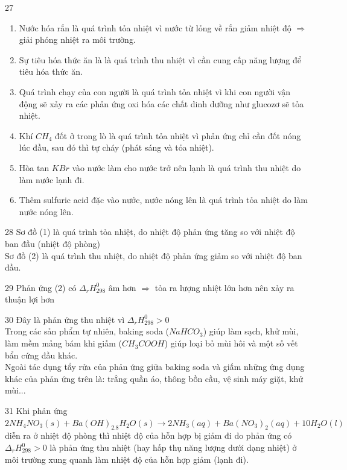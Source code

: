 \def\writeANS{}
\begin{loigiaibth}{27}
  \begin {enumerate} \item Nước hóa rắn là quá trình tỏa nhiệt vì nước từ lỏng về rắn giảm nhiệt độ $\Rightarrow $ giải phóng nhiệt ra môi trường. \item Sự tiêu hóa thức ăn là là quá trình thu nhiệt vì cần cung cấp năng lượng để tiêu hóa thức ăn. \item Quá trình chạy của con người là quá trình tỏa nhiệt vì khi con người vận động sẽ xảy ra các phản ứng oxi hóa các chất dinh dưỡng như glucozơ sẽ tỏa nhiệt. \item Khí $CH_4$ đốt ở trong lò là quá trình tỏa nhiệt vì phản ứng chỉ cần đốt nóng lúc đầu, sau đó thì tự cháy (phát sáng và tỏa nhiệt). \item Hòa tan $KBr$ vào nước làm cho nước trở nên lạnh là quá trình thu nhiệt do làm nước lạnh đi. \item Thêm sulfuric acid đặc vào nước, nước nóng lên là quá trình tỏa nhiệt do làm nước nóng lên. \end {enumerate}
\end{loigiaibth}
\def\writeANS{}
\begin{loigiaibth}{28}
  Sơ đồ (1) là quá trình tỏa nhiệt, do nhiệt độ phản ứng tăng so với nhiệt độ ban đầu (nhiệt độ phòng) \\ Sơ đồ (2) là quá trình thu nhiệt, do nhiệt độ phản ứng giảm so với nhiệt độ ban đầu.
\end{loigiaibth}
\def\writeANS{}
\begin{loigiaibth}{29}
  Phản ứng (2) có $\Delta _r H_{298}^0$ âm hơn $\Rightarrow $ tỏa ra lượng nhiệt lớn hơn nên xảy ra thuận lợi hơn
\end{loigiaibth}
\def\writeANS{}
\begin{loigiaibth}{30}
  Đây là phản ứng thu nhiệt vì $\Delta _r H_{298}^0 > 0$ \\ Trong các sản phẩm tự nhiên, baking soda ($NaHCO_3$) giúp làm sạch, khử mùi, làm mềm mảng bám khi giấm ($CH_3COOH$) giúp loại bỏ mùi hôi và một số vết bẩn cứng đầu khác. \\ Ngoài tác dụng tẩy rửa của phản ứng giữa baking soda và giấm những ứng dụng khác của phản ứng trên là: trắng quần áo, thông bồn cầu, vệ sinh máy giặt, khử mùi...
\end{loigiaibth}
\def\writeANS{}
\begin{loigiaibth}{31}
  Khi phản ứng $2NH_4NO_3(s) + Ba(OH)_2.8H_2O(s) \longrightarrow 2NH_3(aq) + Ba(NO_3)_2(aq) + 10H_2O(l)$ diễn ra ở nhiệt độ phòng thì nhiệt độ của hỗn hợp bị giảm đi do phản ứng có $\Delta _r H_{298}^0 > 0$ là phản ứng thu nhiệt (hay hấp thụ năng lượng dưới dạng nhiệt) ở môi trường xung quanh làm nhiệt độ của hỗn hợp giảm (lạnh đi).
\end{loigiaibth}

